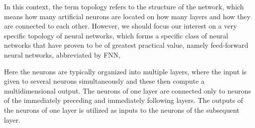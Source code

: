 In this context, the term topology refers to the structure of the network, which means how many artificial neurons are located on how many layers and how they are connected to each other. However, we should focus our interest on a very specific topology of neural networks, which forms a specific class of neural networks that have proven to be of greatest practical value, namely feed-forward neural networks, abbreviated by FNN,



Here the neurons are typically organized into multiple layers, where the input is given to several neurons simultaneously and these then compute a multidimensional output. The neurons of one layer are connected only to neurons of the immediately preceding and immediately following layers. The outputs of the neurons of one layer is utilized as inputs to the neurons of the subsequent layer. \\


